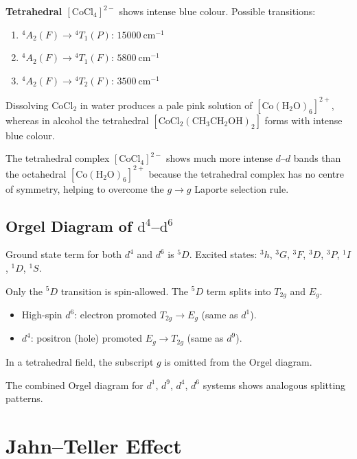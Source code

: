 \documentclass[12pt,a4paper]{article}
\begin{document}
\textbf{Tetrahedral $[\mathrm{CoCl_4}]^{2-}$} shows intense blue colour. Possible transitions:
\begin{enumerate}
  \item ${}^4A_2(F) \to {}^4T_1(P)$: $15000\ \mathrm{cm}^{-1}$
  \item ${}^4A_2(F) \to {}^4T_1(F)$: $5800\ \mathrm{cm}^{-1}$
  \item ${}^4A_2(F) \to {}^4T_2(F)$: $3500\ \mathrm{cm}^{-1}$
\end{enumerate}

Dissolving $\mathrm{CoCl}_2$ in water produces a pale pink solution of $[\mathrm{Co(H_2O)_6}]^{2+}$, whereas in alcohol the tetrahedral $[\mathrm{CoCl_2(CH_3CH_2OH)_2}]$ forms with intense blue colour.

The tetrahedral complex $[\mathrm{CoCl_4}]^{2-}$ shows much more intense $d$--$d$ bands than the octahedral $[\mathrm{Co(H_2O)_6}]^{2+}$ because the tetrahedral complex has no centre of symmetry, helping to overcome the $g \to g$ Laporte selection rule.

\subsection{Orgel Diagram of $\mathrm{d}^4$--$\mathrm{d}^6$}

Ground state term for both $d^4$ and $d^6$ is ${}^5D$. Excited states: ${}^3h$, ${}^3G$, ${}^3F$, ${}^3D$, ${}^3P$, ${}^1I$, ${}^1D$, ${}^1S$.

Only the ${}^5D$ transition is spin-allowed. The ${}^5D$ term splits into $T_{2g}$ and $E_g$.
\begin{itemize}
  \item High-spin $d^6$: electron promoted $T_{2g} \to E_g$ (same as $d^1$).
  \item $d^4$: positron (hole) promoted $E_g \to T_{2g}$ (same as $d^9$).
\end{itemize}

In a tetrahedral field, the subscript $g$ is omitted from the Orgel diagram.

The combined Orgel diagram for $d^1$, $d^9$, $d^4$, $d^6$ systems shows analogous splitting patterns.

\section{Jahn--Teller Effect}
\end{document}

